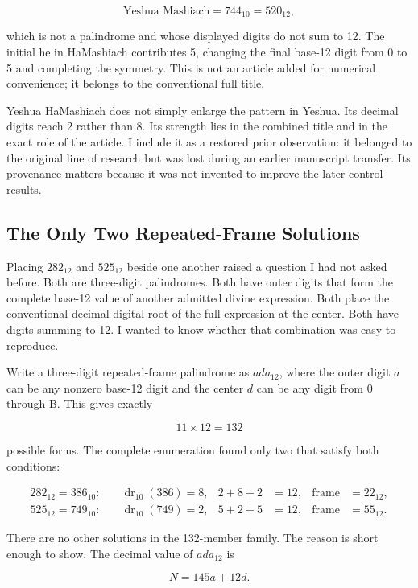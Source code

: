 \[
\text{Yeshua Mashiach}=744_{10}=520_{12},
\]

which is not a palindrome and whose displayed digits do not sum to 12. The initial he in HaMashiach contributes 5, changing the final base-12 digit from 0 to 5 and completing the symmetry. This is not an article added for numerical convenience; it belongs to the conventional full title.

Yeshua HaMashiach does not simply enlarge the pattern in Yeshua. Its decimal digits reach 2 rather than 8. Its strength lies in the combined title and in the exact role of the article. I include it as a restored prior observation: it belonged to the original line of research but was lost during an earlier manuscript transfer. Its provenance matters because it was not invented to improve the later control results.

\subsection{The Only Two Repeated-Frame Solutions}

Placing $282_{12}$ and $525_{12}$ beside one another raised a question I had not asked before. Both are three-digit palindromes. Both have outer digits that form the complete base-12 value of another admitted divine expression. Both place the conventional decimal digital root of the full expression at the center. Both have digits summing to 12. I wanted to know whether that combination was easy to reproduce.

Write a three-digit repeated-frame palindrome as $ada_{12}$, where the outer digit $a$ can be any nonzero base-12 digit and the center $d$ can be any digit from 0 through B. This gives exactly

\[
11\times12=132
\]

possible forms. The complete enumeration found only two that satisfy both conditions:

\begin{align*}
282_{12}=386_{10}:&\quad \operatorname{dr}_{10}(386)=8,
&2+8+2&=12,
&\text{frame}&=22_{12},\\
525_{12}=749_{10}:&\quad \operatorname{dr}_{10}(749)=2,
&5+2+5&=12,
&\text{frame}&=55_{12}.
\end{align*}

There are no other solutions in the 132-member family. The reason is short enough to show. The decimal value of $ada_{12}$ is

\[
N=145a+12d.
\]

